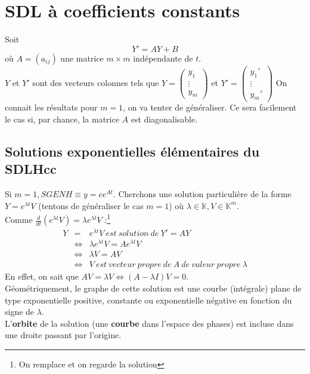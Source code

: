 \documentclass	[11pt, a4paper, openany]{book}
\begin{document}
\setcounter{section}{2}
\section{SDL à coefficients constants}
Soit 
\begin{equation}
Y' = AY + B
\end{equation}
où $A = (a_{ij})$ une matrice $m\times m$ indépendante de $t$.\\
$Y$ et $Y'$ sont des vecteurs colonnes tels que $Y = \left(\begin{array}{l}
y_1\\
\vdots\\
y_m
\end{array}\right)$ et $Y' = \left(\begin{array}{l}
y_1'\\
\vdots\\
y_m'
\end{array}\right)$
On connait les résultats pour $m=1$, on va tenter de généraliser. Ce sera facilement le cas si, par chance, la matrice $A$ est diagonalisable.

\subsection{Solutions exponentielles élémentaires du SDLHcc}
Si $m=1, SGENH \equiv y = ce^{At}$. Cherchons une solution particulière de la forme $Y = e^{\lambda t}V$ (tentons de généraliser le cas $m=1$) où $\lambda \in \mathbb{K}, V \in \mathbb{K}^m$.\\
Comme $\frac{d}{dt}(e^{\lambda t}V) = \lambda e^{\lambda t}V$ :\footnote{On remplace et on regarde la solution}
\begin{eqnarray}
Y &=& e^{\lambda t}V\ est\ solution\ de\ Y'=AY\\
&\Leftrightarrow & \lambda e^{\lambda t}V = Ae^{\lambda t}V\\
&\Leftrightarrow & \lambda V = AV\\
&\Leftrightarrow &V\ est\ vecteur\ propre\ de\ A\ de\ valeur\ propre\ \lambda
\end{eqnarray}
En effet, on sait que $AV = \lambda V \Leftrightarrow(A-\lambda I)V = 0$.\\
Géométriquement, le graphe de cette solution est une courbe (intégrale) plane de type exponentielle positive, constante ou exponentielle négative en fonction du signe de $\lambda$.\\
L'\textbf{orbite} de la solution (une \textbf{courbe} dans l'espace des phases) est incluse dans une droite passant par l'origine.
\end{document}
